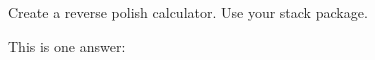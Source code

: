 \begin{Exercise}[title={Calculator},difficulty=2]
\label{ex:calc}
\Question\label{ex:calc q1} Create a reverse polish calculator. Use your
stack package.

\end{Exercise}

\begin{Answer}
\Question This is one answer:


\end{Answer}
